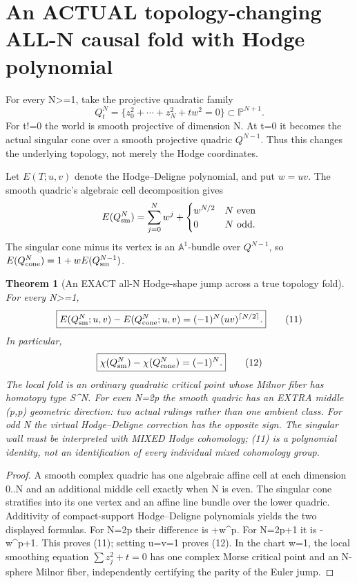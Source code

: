 \documentclass[11pt]{article}
\newtheorem{theorem}{Theorem}
\begin{document}
\section{An ACTUAL topology-changing ALL-N causal fold with Hodge polynomial}
For every N>=1, take the projective quadratic family
\[
 Q_t^N=\{z_0^2+\cdots+z_N^2+t w^2=0\}
                      \subset\mathbb P^{N+1}.
\]
For t!=0 the world is smooth projective of dimension N.
At t=0 it becomes the actual singular cone over a smooth
projective quadric \(Q^{N-1}\). Thus this changes the
underlying topology, not merely the Hodge coordinates.

Let \(E(T;u,v)\) denote the Hodge--Deligne polynomial,
and put \(w=uv\).
The smooth quadric's algebraic cell decomposition gives
\[
 E(Q^N_{\rm sm})=\sum_{j=0}^N w^j+
  \begin{cases}w^{N/2}&N\text{ even}\\0&N\text{ odd.}\end{cases}
\]
The singular cone minus its vertex is an
\(\mathbb A^1\)-bundle over \(Q^{N-1}\), so
\(E(Q^N_{\rm cone})=1+wE(Q^{N-1}_{\rm sm})\).

\begin{theorem}[An EXACT all-N Hodge-shape jump across a true topology fold]
For every N>=1,
\[
 \boxed{
 E(Q^N_{\rm sm};u,v)-E(Q^N_{\rm cone};u,v)
      =(-1)^N(uv)^{\lceil N/2\rceil}.}           \tag{11}
\]
In particular,
\[
 \boxed{\chi(Q^N_{\rm sm})-\chi(Q^N_{\rm cone})
          =(-1)^N.}                              \tag{12}
\]
The local fold is an ordinary quadratic critical
point whose Milnor fiber has homotopy type S^N.
For even N=2p the smooth quadric has an EXTRA
middle (p,p) geometric direction: two actual
rulings rather than one ambient class.
For odd N the virtual Hodge--Deligne correction
has the opposite sign. The singular wall must
be interpreted with MIXED Hodge cohomology;
(11) is a polynomial identity, not an identification
of every individual mixed cohomology group.
\end{theorem}
\begin{proof}
A smooth complex quadric has one algebraic
affine cell at each dimension 0..N and an
additional middle cell exactly when N is even.
The singular cone stratifies into its one vertex
and an affine line bundle over the lower quadric.
Additivity of compact-support Hodge--Deligne
polynomials yields the two displayed formulas.
For N=2p their difference is +w^p. For
N=2p+1 it is -w^{p+1}. This proves (11);
setting u=v=1 proves (12). In the chart w=1,
the local smoothing equation \(\sum z_j^2+t=0\)
has one complex Morse critical point and an
N-sphere Milnor fiber, independently certifying
the parity of the Euler jump.
\end{proof}
\end{document}
